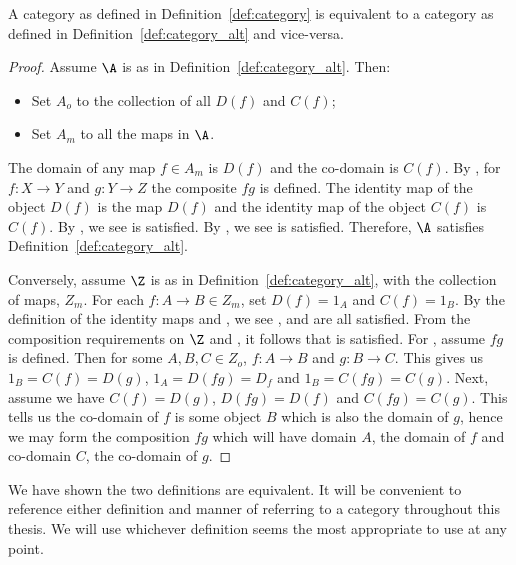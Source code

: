 \begin{lemma}\label{lem:category_is_category_alt}
  A category as defined in Definition~\ref{def:category} is equivalent to a category as defined
  in Definition~\ref{def:category_alt} and vice-versa.
\end{lemma}
\begin{proof}
  Assume $\A$ is as in Definition~\ref{def:category_alt}. Then:
  \begin{itemize}
    \item Set $A_o$ to the collection of all  $D(f)$ and $C(f)$;
    \item Set $A_m$ to all the maps in $\A$.
  \end{itemize}
  The domain of any map $f \in A_m$ is $D(f)$
  and the co-domain is $C(f)$. By \cataltthree, for $f:X\to Y$ and $g:Y \to Z$ the composite $f g$ is
  defined. The identity map of the object $D(f)$ is the map $D(f)$ and the identity map of the
  object $C(f)$ is $C(f)$. By \cataltfive, we see \catone is satisfied. By \cataltfour, we see
  \cattwo is satisfied. Therefore, $\A$ satisfies Definition~\ref{def:category_alt}.

  Conversely, assume $\Z$ is as in Definition~\ref{def:category_alt}, with the
  collection of maps, $Z_m$. For each $f : A \to B \in Z_m$, set $D(f) = 1_A$ and $C(f) = 1_B$. By
  the definition of the identity maps and \catone, we see \cataltone, \catalttwo and \cataltfive are
  all satisfied. From the composition requirements on $\Z$ and \cattwo, it follows that
  \cataltfour is satisfied. For \cataltthree, assume $f g$ is defined. Then for some $A,B,C \in Z_o$,
  $f:A \to B$ and $g:B \to C$. This gives us $1_B = C(f) = D(g)$, $1_A = D(f g) = D_f$ and $1_B =
  C(f g) = C(g)$. Next, assume we have $C(f) = D(g)$, $D(f g) = D(f)$ and $C(f g) = C(g)$. This
  tells us the co-domain of $f$ is some object $B$ which is also the domain of $g$, hence we may
  form the composition $f g$ which will have domain $A$, the domain of $f$ and co-domain $C$, the
  co-domain of $g.$
\end{proof}

We have shown the two definitions are equivalent. It will be convenient to reference either
definition and manner of referring to a category throughout this thesis. We will use
whichever definition seems the most appropriate to use at any point.

